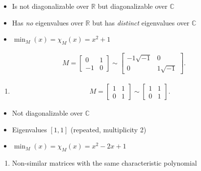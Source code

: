 \begin{itemize}
\item
  Is not diagonalizable over \({\mathbb{R}}\) but diagonalizable over
  \({\mathbb{C}}\)
\item
  Has \emph{no} eigenvalues over \({\mathbb{R}}\) but has
  \emph{distinct} eigenvalues over \({\mathbb{C}}\)
\item
  \(\min_M(x) = \chi_M(x) = x^2 + 1\)
\end{itemize}

\begin{align*} M = \left[\begin{array}{rr} 0  & 1 \\ -1 & 0 \end{array}\right] \sim \left[\begin{array}{r|r} -1 \sqrt{-1} & 0 \\ \hline 0 & 1 \sqrt{-1} \end{array}\right] .\end{align*}

\begin{enumerate}
\def\labelenumi{\arabic{enumi}.}
\setcounter{enumi}{1}
\tightlist
\item
  \begin{align*}     M = \left[\begin{array}{rr}     1 & 1 \\     0 & 1     \end{array}\right] \sim     \left[\begin{array}{rr}     1 & 1 \\     0 & 1     \end{array}\right]     .\end{align*}
\end{enumerate}

\begin{itemize}
\item
  Not diagonalizable over \({\mathbb{C}}\)
\item
  Eigenvalues \([1, 1]\) (repeated, multiplicity 2)
\item
  \(\min_M(x) = \chi_M(x) = x^2-2x+1\)
\end{itemize}

\begin{enumerate}
\def\labelenumi{\arabic{enumi}.}
\setcounter{enumi}{2}
\tightlist
\item
  Non-similar matrices with the same characteristic polynomial
\end{enumerate}

